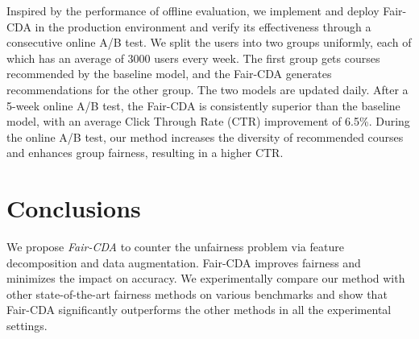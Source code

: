 \documentclass[letterpaper]{article} %
\begin{document}
\begin{table}[t]
    \centering\small
        \caption{Offline results on a product dataset from an online course recommender system.} %
    \label{table:offline}
    \vspace{-5pt}
\end{table}

Inspired by the performance of offline evaluation, we implement and deploy Fair-CDA in the production environment and verify its effectiveness through a consecutive online A/B test. We split the users into two groups uniformly, each of which has an average of 3000 users every week. The first group gets courses recommended by the baseline model, and the Fair-CDA generates recommendations for the other group. The two models are updated daily. After a 5-week online A/B test, the Fair-CDA is consistently superior than the baseline model, with an average Click Through Rate (CTR) improvement of 6.5\%. During the online A/B test, our method increases the diversity of recommended courses and enhances group fairness, resulting in a higher CTR.

\section{Conclusions}

We propose {\it Fair-CDA} to counter the unfairness problem via feature decomposition and data augmentation. Fair-CDA improves fairness and minimizes the impact on accuracy. We experimentally compare our method with other state-of-the-art fairness methods on various benchmarks and show that Fair-CDA significantly outperforms the other methods in all the experimental settings.
\end{document}
